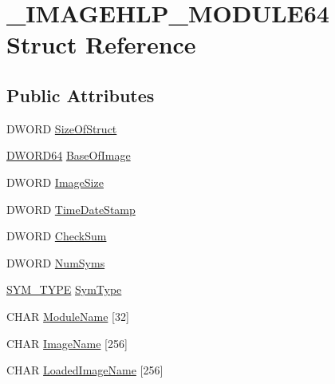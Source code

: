 \hypertarget{struct___i_m_a_g_e_h_l_p___m_o_d_u_l_e64}{\section{\-\_\-\-I\-M\-A\-G\-E\-H\-L\-P\-\_\-\-M\-O\-D\-U\-L\-E64 Struct Reference}
\label{struct___i_m_a_g_e_h_l_p___m_o_d_u_l_e64}
}
\subsection*{Public Attributes}
\begin{DoxyCompactItemize}
\item 
D\-W\-O\-R\-D \hyperlink{struct___i_m_a_g_e_h_l_p___m_o_d_u_l_e64_a4a2ce54731d9419530a0a0259fb2247c}{Size\-Of\-Struct}
\item 
\hyperlink{_stack_walker_8h_a97fb241c597b99bcb965858f53cacac4}{D\-W\-O\-R\-D64} \hyperlink{struct___i_m_a_g_e_h_l_p___m_o_d_u_l_e64_a8939132963344f64d22dd5d909ae1c09}{Base\-Of\-Image}
\item 
D\-W\-O\-R\-D \hyperlink{struct___i_m_a_g_e_h_l_p___m_o_d_u_l_e64_a4dbf87d9da85b62bc0c404f9ce16e2d5}{Image\-Size}
\item 
D\-W\-O\-R\-D \hyperlink{struct___i_m_a_g_e_h_l_p___m_o_d_u_l_e64_a280ae94e389b6070e0e9a0b0d9b51012}{Time\-Date\-Stamp}
\item 
D\-W\-O\-R\-D \hyperlink{struct___i_m_a_g_e_h_l_p___m_o_d_u_l_e64_aa7d1e2fc9139ef2a811c0f29a7c3264e}{Check\-Sum}
\item 
D\-W\-O\-R\-D \hyperlink{struct___i_m_a_g_e_h_l_p___m_o_d_u_l_e64_a7ebda45966492626167b9e35ec4e6e59}{Num\-Syms}
\item 
\hyperlink{_stack_walker_8cpp_a3ac18bf070251bbc81b0a6629840f6b6}{S\-Y\-M\-\_\-\-T\-Y\-P\-E} \hyperlink{struct___i_m_a_g_e_h_l_p___m_o_d_u_l_e64_a18640a2da772eca54c9cce12fe881217}{Sym\-Type}
\item 
C\-H\-A\-R \hyperlink{struct___i_m_a_g_e_h_l_p___m_o_d_u_l_e64_a9e83a68ca4e2d6b3c201b2bb558236b5}{Module\-Name} \mbox{[}32\mbox{]}
\item 
C\-H\-A\-R \hyperlink{struct___i_m_a_g_e_h_l_p___m_o_d_u_l_e64_ad9b6bbb903505452d6c9075e062617d9}{Image\-Name} \mbox{[}256\mbox{]}
\item 
C\-H\-A\-R \hyperlink{struct___i_m_a_g_e_h_l_p___m_o_d_u_l_e64_ac8368e64fa80fa6b2101bcd09819fa71}{Loaded\-Image\-Name} \mbox{[}256\mbox{]}
\end{DoxyCompactItemize}


